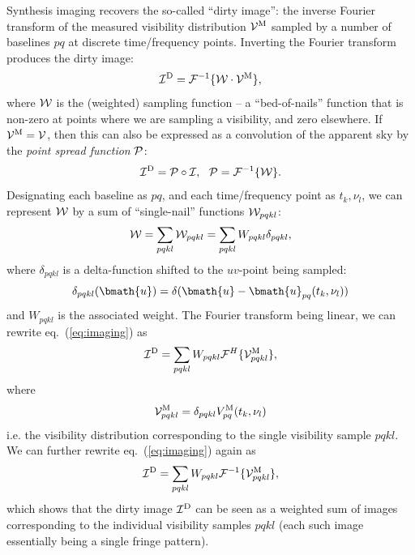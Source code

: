\documentclass[useAMS,usenatbib]{mn2e}
\begin{document}
Synthesis imaging recovers the so-called ``dirty image'': the inverse Fourier transform of the measured visibility distribution $\mathcal{V}^\mathrm{M}$ sampled by a number of baselines $pq$ at discrete time/frequency points. Inverting the Fourier transform produces the dirty image:
\begin{equation}
\label{eq:imaging}
\mathcal{I}^\mathrm{D} = \mathcal{F}^{-1}\{ \mathcal{W}\cdot\mathcal{V}^\mathrm{M} \} ,
\end{equation}
where $\mathcal{W}$ is the (weighted) sampling function -- a ``bed-of-nails'' function that is non-zero at points where we 
are sampling a visibility, and zero elsewhere. If $\mathcal{V}^\mathrm{M}=\mathcal{V}$, then this can also be expressed as a convolution of the apparent sky by the \emph{point spread function}
$\mathcal{P}$:
\begin{equation}
\mathcal{I}^\mathrm{D} = \mathcal{P}\circ\mathcal{I},~~\mathcal{P}=\mathcal{F}^{-1}\{\mathcal{W}\}.
\end{equation}
Designating each baseline as $pq$, and each time/frequency point
as $t_k,\nu_l$, we can represent $\mathcal{W}$ by a sum of  ``single-nail'' functions 
$\mathcal{W}_{pqkl}$:
\begin{equation}
\mathcal{W} = \sum_{pqkl} \mathcal{W}_{pqkl} = \sum_{pqkl} W_{pqkl} \delta_{pqkl},
\end{equation}
where $\delta_{pqkl}$ is a delta-function shifted to the $uv$-point being sampled:
\begin{equation}
\delta_{pqkl}(\bmath{u}) = \delta(\bmath{u}-\bmath{u}_{pq}(t_k,\nu_l))
\end{equation}
and $W_{pqkl}$ is the 
associated weight. The Fourier transform being linear, we can rewrite eq.~(\ref{eq:imaging}) as 
\begin{equation}
\label{eq:imaging2}
\mathcal{I}^\mathrm{D} = \sum_{pqkl} W_{pqkl} \mathcal{F}^H\{ \mathcal{V}^\mathrm{M}_{pqkl} \},
\end{equation}
where 
\begin{equation}
\label{eq:imaging2a}
\mathcal{V}^\mathrm{M}_{pqkl} = \delta_{pqkl} V^\mathrm{M}_{pq}(t_k,\nu_l)
\end{equation}
i.e. the visibility distribution corresponding to the single visibility sample $pqkl$. We can further rewrite eq.~(\ref{eq:imaging})
again as
\begin{equation}
\label{eq:imaging3}
\mathcal{I}^\mathrm{D} =  \sum_{pqkl} W_{pqkl} \mathcal{F}^{-1}\{ \mathcal{V}^\mathrm{M}_{pqkl} \},
\end{equation}
which shows that the dirty image $\mathcal{I}^\mathrm{D}$ can be seen as a weighted sum of images corresponding to the individual visibility samples $pqkl$ (each such image essentially being a single fringe pattern).
\end{document}
